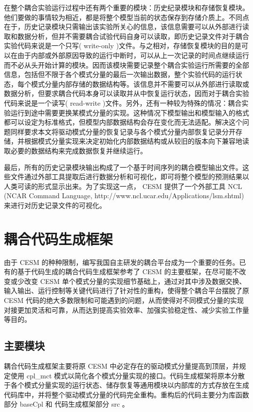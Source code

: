 在整个耦合实验运行过程中还有两个重要的模块：历史纪录模块和存储恢复模块。他们要做的事情较为相近，都是将整个模型当前的状态保存到存储介质上。不同点在于，历史记录模块只需输出该实验所关心的信息，该信息需要可以从外部进行读取和数据分析，但并不需要耦合试验代码自身可以读取，即历史记录文件对于耦合实验代码来说是一个只写( write-only )文件。与之相对，存储恢复模块的目的是可以在由于内部或外部原因导致的运行中断时，可以从上一次记录的时间点继续运行而不必从头开始计算的模块。因而该模块需要记录整个耦合实验运行所需要的全部信息，包括但不限于各个模式分量的最后一次输出数据，整个实验代码的运行状态，每个模式分量内部存储的数据结构等。该信息并不需要可以从外部进行读取或数据分析，但要求耦合代码本身可以读取并从中恢复运行状态，因而对于耦合实验代码来说是一个读写( read-write )文件。另外，还有一种较为特殊的情况：耦合实验运行到途中需要更换某模式分量的实现。这种情况下模型输出和模型输入的格式都可以设定为标准格式，但模型内部数据结构会存在变化而无法适配。解决这个问题同样要求本文将驱动模式分量的恢复记录与各个模式分量内部恢复记录分开存储，并根据模式分量实现来决定初始化内部数据结构或从较旧的版本向下兼容地读取必要的数据结构来完成数据恢复并继续运行。

最后，所有的历史记录模块输出构成了一个基于时间序列的耦合模型输出文件。这些文件通过外部工具提取后进行数据分析和可视化，即可将整个模型的预测结果以人类可读的形式显示出来。为了实现这一点， CESM 提供了一个外部工具 NCL (NCAR Command Language, http://www.ncl.ucar.edu/Applications/lsm.shtml)来进行对历史记录文件的可视化。

\section{耦合代码生成框架}

由于 CESM 的种种限制，编写我国自主研发的耦合平台成为一个重要的任务。已有的基于代码生成的耦合代码生成框架\cite{zhonganrun}参考了 CESM 的主要框架，在尽可能不改变或少改变 CESM 单个模式分量的实现细节基础上，通过对其中涉及数据交换、输入输出、运行控制等关键代码进行了针对性的重构，使得整个耦合平台摆脱了原 CESM 代码的绝大多数限制和可能遇到的问题，从而使得对不同模式分量的实现对接更加灵活和可靠，从而达到提高实验效率、加强实验稳定性、减少实验工作量等目的。

\subsection{主要模块}

耦合代码生成框架主要将原 CESM 中必定存在的驱动模式分量提高到顶层，并规定使用 cpl\_mct 模式以简化各个模式分量实现的接口。代码生成框架将原本分散于各个模式分量实现的运行状态、储存恢复等通用模块以内部库的方式存放在生成代码库中，并将整个驱动模式分量的代码完全重构。重构后的代码主要分为库函数部分 baseCpl 和 代码生成框架部分 src 。

